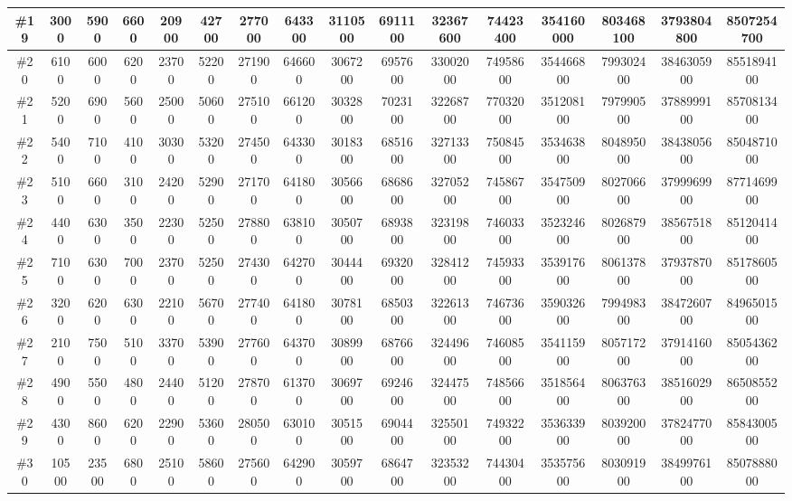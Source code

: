 \documentclass[titlepage]{article}
\begin{document}
\begin{landscape}
\begin{table}
\begin{tabular}{|c|c|c|c|c|c|c|c|c|c|c|c|c|c|c|c|}
				\hline
				\#19     & 3000   & 5900  & 6600  & 20900 & 42700 & 277000 & 643300 & 3110500 & 6911100 & 32367600 & 74423400 & 354160000 & 803468100 & 3793804800 & 8507254700  \\ 
				\hline
				\#20     & 6100   & 6000  & 6200  & 23700 & 52200 & 271900 & 646600 & 3067200 & 6957600 & 33002000 & 74958600 & 354466800 & 799302400 & 3846305900 & 8551894100  \\ 
				\hline
				\#21     & 5200   & 6900  & 5600  & 25000 & 50600 & 275100 & 661200 & 3032800 & 7023100 & 32268700 & 77032000 & 351208100 & 797990500 & 3788999100 & 8570813400  \\ 
				\hline
				\#22     & 5400   & 7100  & 4100  & 30300 & 53200 & 274500 & 643300 & 3018300 & 6851600 & 32713300 & 75084500 & 353463800 & 804895000 & 3843805600 & 8504871000  \\ 
				\hline
				\#23     & 5100   & 6600  & 3100  & 24200 & 52900 & 271700 & 641800 & 3056600 & 6868600 & 32705200 & 74586700 & 354750900 & 802706600 & 3799969900 & 8771469900  \\ 
				\hline
				\#24     & 4400   & 6300  & 3500  & 22300 & 52500 & 278800 & 638100 & 3050700 & 6893800 & 32319800 & 74603300 & 352324600 & 802687900 & 3856751800 & 8512041400  \\ 
				\hline
				\#25     & 7100   & 6300  & 7000  & 23700 & 52500 & 274300 & 642700 & 3044400 & 6932000 & 32841200 & 74593300 & 353917600 & 806137800 & 3793787000 & 8517860500  \\ 
				\hline
				\#26     & 3200   & 6200  & 6300  & 22100 & 56700 & 277400 & 641800 & 3078100 & 6850300 & 32261300 & 74673600 & 359032600 & 799498300 & 3847260700 & 8496501500  \\ 
				\hline
				\#27     & 2100   & 7500  & 5100  & 33700 & 53900 & 277600 & 643700 & 3089900 & 6876600 & 32449600 & 74608500 & 354115900 & 805717200 & 3791416000 & 8505436200  \\ 
				\hline
				\#28     & 4900   & 5500  & 4800  & 24400 & 51200 & 278700 & 613700 & 3069700 & 6924600 & 32447500 & 74856600 & 351856400 & 806376300 & 3851602900 & 8650855200  \\ 
				\hline
				\#29     & 4300   & 8600  & 6200  & 22900 & 53600 & 280500 & 630100 & 3051500 & 6904400 & 32550100 & 74932200 & 353633900 & 803920000 & 3782477000 & 8584300500  \\ 
				\hline
				\#30     & 10500  & 23500 & 6800  & 25100 & 58600 & 275600 & 642900 & 3059700 & 6864700 & 32353200 & 74430400 & 353575600 & 803091900 & 3849976100 & 8507888000  \\ 

\end{tabular}
\end{table}
\end{landscape}
\end{document}
